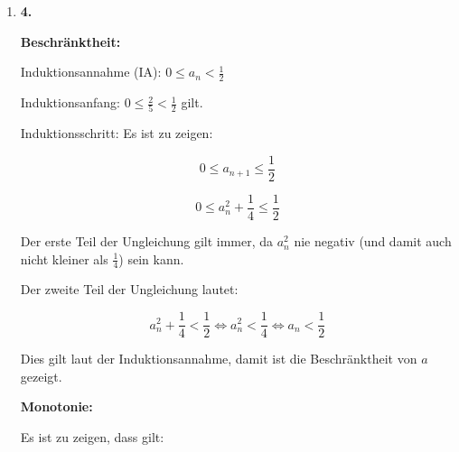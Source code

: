 \documentclass [a4paper,11pt]{article}
\begin{document}
\begin {enumerate}
\begin{enumerate}
				\item[b)]
					Es sei $\epsilon > 0$ folglich ergibt sich aus a:
					\[|a_{n}-a| < \epsilon \Leftrightarrow \frac{7}{n+3} < \epsilon \Leftrightarrow n> \frac{7}{\epsilon}-3\]
					Entsprechend kann man ein $N$ wählen sodass $|a_{n}-a| < \epsilon$ für $n \geq N$ wie in der Definition von Konvergenz gefordert: $N > \frac{7}{\epsilon} - 3$.

				\item[c)]
					Hier muss die oben berechnete Unleichung benutzt werden.
					Beispiel: $N > \frac{7}{\epsilon} - 3 \Rightarrow n > 67$, folglich muss das kleinstmögliche $N = 68$ sein (da $N$ \em{größer als} $67$ sein soll).

					\begin{tabular}{c|c}
						$\epsilon$ & $N$ \\ \hline
						$\frac{1}{10}$ & $68$ \\ [1.5ex]
						$\frac{1}{100}$ & $698$ \\ [1.5ex]
						$\frac{1}{100000}$ & $699998$ \\ [1.5ex]

					\end{tabular}
			\end{enumerate}

		\item[\textbf{4.}]

			\textbf{Beschränktheit:}

			Induktionsannahme (IA): $0 \leq a_n < \frac{1}{2}$

			Induktionsanfang: $0 \leq \frac{2}{5} < \frac{1}{2}$ gilt.

			Induktionsschritt: Es ist zu zeigen:

			$$0 \leq a_{n+1} \leq \frac{1}{2}$$

			$$0 \leq a_n^2 + \frac{1}{4} \leq \frac{1}{2}$$

			Der erste Teil der Ungleichung gilt immer, da $a_n^2$ nie negativ (und damit
			auch nicht kleiner als $\frac{1}{4}$) sein kann.

			Der zweite Teil der Ungleichung lautet:

			$$a_n^2 + \frac{1}{4} < \frac{1}{2}
			\Leftrightarrow a_n^2 < \frac{1}{4}
			\Leftrightarrow a_n < \frac{1}{2}$$

			Dies gilt laut der Induktionsannahme, damit ist die Beschränktheit von
			$a$ gezeigt.

			\textbf{Monotonie:}

			Es ist zu zeigen, dass gilt:


\end{enumerate}
\end{document}
